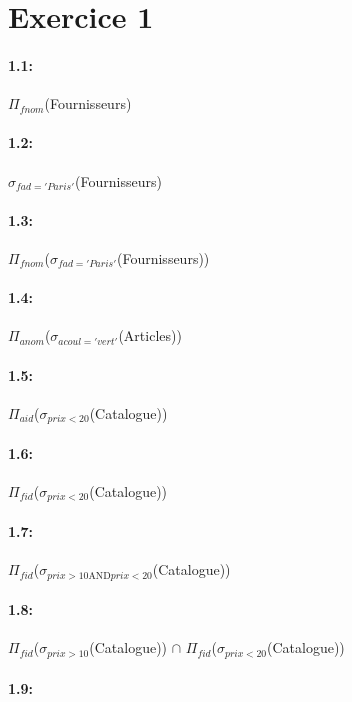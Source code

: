 \documentclass[a4paper,10pt]{article}
\begin{document}
\section{Exercice 1}

\paragraph{1.1:}
$\Pi_{fnom}$(Fournisseurs)

\paragraph{1.2:}
$\sigma_{fad='Paris'}$(Fournisseurs)

\paragraph{1.3:}
$\Pi_{fnom}$($\sigma_{fad='Paris'}$(Fournisseurs))

\paragraph{1.4:}
$\Pi_{anom}$($\sigma_{acoul='vert'}$(Articles))

\paragraph{1.5:}

$\Pi_{aid}$($\sigma_{prix < 20 }$(Catalogue))

\paragraph{1.6:}

$\Pi_{fid}$($\sigma_{prix < 20 }$(Catalogue))

\paragraph{1.7:}

$\Pi_{fid}$($\sigma_{prix > 10 \mbox{AND} prix < 20 }$(Catalogue))

\paragraph{1.8:}

$\Pi_{fid}$($\sigma_{prix > 10 }$(Catalogue)) $\cap$ $\Pi_{fid}$($\sigma_{prix < 20 }$(Catalogue))

\paragraph{1.9:}
\end{document}
